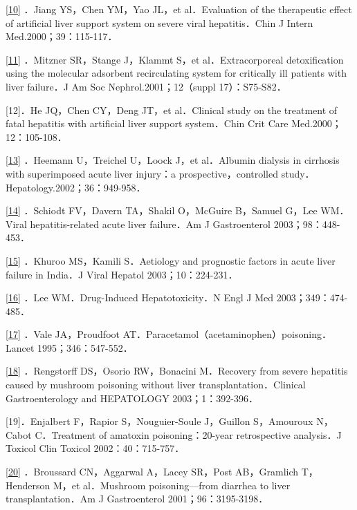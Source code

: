 \protect\hyperlink{text00019.htmlux5cux23ch10-18-back}{{[}10{]}} ．Jiang
YS，Chen YM，Yao JL，et al．Evaluation of the therapeutic effect of
artificial liver support system on severe viral hepatitis．Chin J Intern
Med.2000；39：115-117．

\protect\hyperlink{text00019.htmlux5cux23ch11-18-back}{{[}11{]}}
．Mitzner SR，Stange J，Klammt S，et al．Extracorporeal detoxification
using the molecular adsorbent recirculating system for critically ill
patients with liver failure．J Am Soc Nephrol.2001；12（suppl
17）：S75-S82．

{[}12{]}．He JQ，Chen CY，Deng JT，et al．Clinical study on the
treatment of fatal hepatitis with artificial liver support system．Chin
Crit Care Med.2000；12：105-108．

\protect\hyperlink{text00019.htmlux5cux23ch13-18-back}{{[}13{]}}
．Heemann U，Treichel U，Loock J，et al．Albumin dialysis in cirrhosis
with superimposed acute liver injury：a prospective，controlled
study．Hepatology.2002；36：949-958．

\protect\hyperlink{text00019.htmlux5cux23ch14-18-back}{{[}14{]}}
．Schiodt FV，Davern TA，Shakil O，McGuire B，Samuel G，Lee WM．Viral
hepatitis-related acute liver failure．Am J Gastroenterol
2003；98：448-453．

\protect\hyperlink{text00019.htmlux5cux23ch15-18-back}{{[}15{]}}
．Khuroo MS，Kamili S．Aetiology and prognostic factors in acute liver
failure in India．J Viral Hepatol 2003；10：224-231．

\protect\hyperlink{text00019.htmlux5cux23ch16-18-back}{{[}16{]}} ．Lee
WM．Drug-Induced Hepatotoxicity．N Engl J Med 2003；349：474-485．

\protect\hyperlink{text00019.htmlux5cux23ch17-18-back}{{[}17{]}} ．Vale
JA，Proudfoot AT．Paracetamol（acetaminophen）poisoning．Lancet
1995；346：547-552．

\protect\hyperlink{text00019.htmlux5cux23ch18-18-back}{{[}18{]}}
．Rengstorff DS，Osorio RW，Bonacini M．Recovery from severe hepatitis
caused by mushroom poisoning without liver transplantation．Clinical
Gastroenterology and HEPATOLOGY 2003；1：392-396．

{[}19{]}．Enjalbert F，Rapior S，Nouguier-Soule J，Guillon S，Amouroux
N，Cabot C．Treatment of amatoxin poisoning：20-year retrospective
analysis．J Toxicol Clin Toxicol 2002：40：715-757．

\protect\hyperlink{text00019.htmlux5cux23ch20-18-back}{{[}20{]}}
．Broussard CN，Aggarwal A，Lacey SR，Post AB，Gramlich T，Henderson
M，et al．Mushroom poisoning---from diarrhea to liver
transplantation．Am J Gastroenterol 2001；96：3195-3198．

